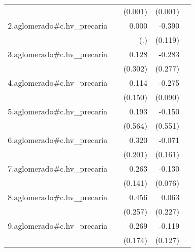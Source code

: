 {\begin{longtable}{l*{4}{D{.}{.}{-1}}}
            &                     &     (0.001)         &     (0.001)         &                     \\
\addlinespace
2.aglomerado#c.hv\_precaria&                     &       0.000         &      -0.390\sym{**} &                     \\
            &                     &         (.)         &     (0.119)         &                     \\
\addlinespace
3.aglomerado#c.hv\_precaria&                     &       0.128         &      -0.283         &                     \\
            &                     &     (0.302)         &     (0.277)         &                     \\
\addlinespace
4.aglomerado#c.hv\_precaria&                     &       0.114         &      -0.275\sym{**} &                     \\
            &                     &     (0.150)         &     (0.090)         &                     \\
\addlinespace
5.aglomerado#c.hv\_precaria&                     &       0.193         &      -0.150         &                     \\
            &                     &     (0.564)         &     (0.551)         &                     \\
\addlinespace
6.aglomerado#c.hv\_precaria&                     &       0.320         &      -0.071         &                     \\
            &                     &     (0.201)         &     (0.161)         &                     \\
\addlinespace
7.aglomerado#c.hv\_precaria&                     &       0.263         &      -0.130         &                     \\
            &                     &     (0.141)         &     (0.076)         &                     \\
\addlinespace
8.aglomerado#c.hv\_precaria&                     &       0.456         &       0.063         &                     \\
            &                     &     (0.257)         &     (0.227)         &                     \\
\addlinespace
9.aglomerado#c.hv\_precaria&                     &       0.269         &      -0.119         &                     \\
            &                     &     (0.174)         &     (0.127)         &                     \\

\end{longtable}}
